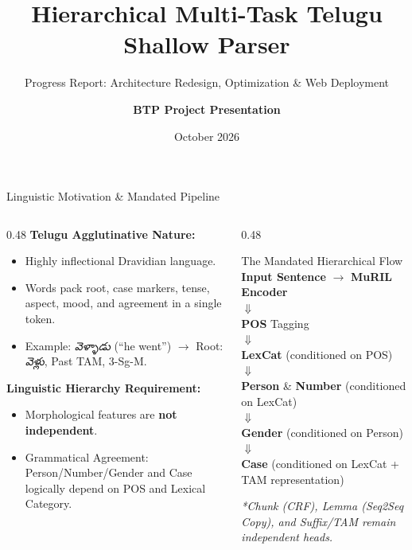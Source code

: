 \documentclass[aspectratio=169, 10pt]{beamer}
\title[\textbf{Telugu Shallow Parser}]{\textbf{Hierarchical Multi-Task Telugu Shallow Parser}}
\subtitle{Progress Report: Architecture Redesign, Optimization \& Web Deployment}
\author{\textbf{BTP Project Presentation}}
\institute[IIIT Hyderabad]{
  Language Technologies Research Centre (LTRC)\\
  International Institute of Information Technology, Hyderabad
}
\date{October 2026}
\begin{document}
\begin{frame}
  \titlepage
\end{frame}

\begin{frame}{Linguistic Motivation \& Mandated Pipeline}
  \begin{columns}[T]
    \begin{column}{0.48\textwidth}
      \textbf{Telugu Agglutinative Nature:}
      \begin{itemize}
        \item Highly inflectional Dravidian language.
        \item Words pack root, case markers, tense, aspect, mood, and agreement in a single token.
        \item Example: \textit{వెళ్ళాడు} (``he went'') $\rightarrow$ Root: \textit{వెళ్లు}, Past TAM, 3-Sg-M.
      \end{itemize}
      \vspace{0.3cm}
      \textbf{Linguistic Hierarchy Requirement:}
      \begin{itemize}
        \item Morphological features are \textbf{not independent}.
        \item Grammatical Agreement: Person/Number/Gender and Case logically depend on POS and Lexical Category.
      \end{itemize}
    \end{column}

    \begin{column}{0.48\textwidth}
      \begin{block}{The Mandated Hierarchical Flow}
        \centering
        \small
        \textbf{Input Sentence} $\rightarrow$ \textbf{MuRIL Encoder}\\
        $\Downarrow$\\
        \textbf{POS} Tagging\\
        $\Downarrow$\\
        \textbf{LexCat} (conditioned on POS)\\
        $\Downarrow$\\
        \textbf{Person} \& \textbf{Number} (conditioned on LexCat)\\
        $\Downarrow$\\
        \textbf{Gender} (conditioned on Person)\\
        $\Downarrow$\\
        \textbf{Case} (conditioned on LexCat + TAM representation)
      \end{block}
      \footnotesize
      \textit{*Chunk (CRF), Lemma (Seq2Seq Copy), and Suffix/TAM remain independent heads.}
    \end{column}
  \end{columns}
\end{frame}
\end{document}

